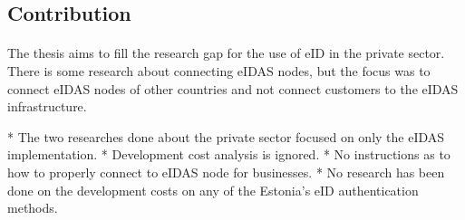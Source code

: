 







\subsection{Contribution}
\paragraph{}

The thesis aims to fill the research gap for the use of eID in the private sector. There is some research about connecting eIDAS nodes, but the focus was to connect eIDAS nodes of other countries and not connect customers to the eIDAS infrastructure.



* The two researches done about the private sector focused on only the eIDAS implementation. 
* Development cost analysis is ignored. 
* No instructions as to how to properly connect to eIDAS node for businesses. 
* No research has been done on the development costs on any of the Estonia's eID authentication methods.


